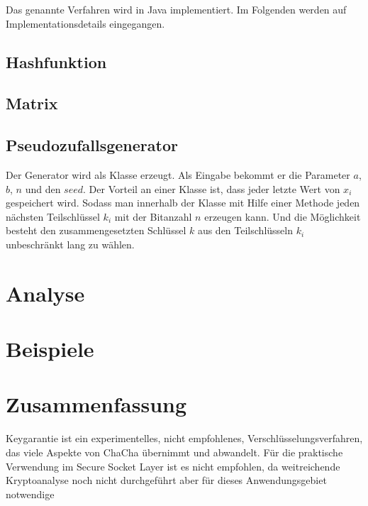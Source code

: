 \documentclass[10pt,a4paper]{article}
\begin{document}
Das genannte Verfahren wird in Java implementiert.
Im Folgenden werden auf Implementationsdetails eingegangen.

\subsection{Hashfunktion}

\subsection{Matrix}

\subsection{Pseudozufallsgenerator}

Der Generator wird als Klasse erzeugt.
Als Eingabe bekommt er die Parameter $a$, $b$, $n$ und
den $seed$.
Der Vorteil an einer Klasse ist, dass jeder letzte Wert von $x_i$ gespeichert wird.
Sodass
man innerhalb der Klasse mit Hilfe einer Methode jeden nächsten Teilschlüssel $k_i$ mit der
Bitanzahl $n$ erzeugen kann.
Und die Möglichkeit besteht den zusammengesetzten Schlüssel $k$
aus den Teilschlüsseln $k_i$ unbeschränkt lang zu wählen.

\section{Analyse}

\section{Beispiele}

\section{Zusammenfassung}

Keygarantie ist ein experimentelles, nicht empfohlenes, Verschlüsselungsverfahren, das viele Aspekte von ChaCha übernimmt und abwandelt.
Für die praktische Verwendung im Secure Socket Layer ist es nicht empfohlen, da weitreichende Kryptoanalyse noch nicht durchgeführt aber für dieses Anwendungsgebiet notwendige

{}

\end{document}
